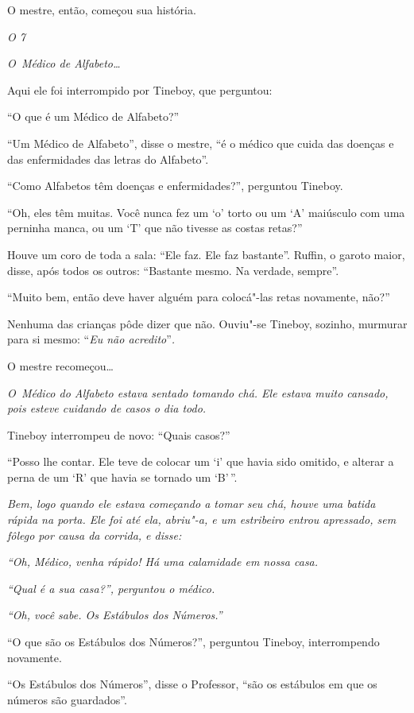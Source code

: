 O mestre, então, começou sua história.

\emph{ O  7  }

\emph{O~Médico de Alfabeto…}

Aqui ele foi interrompido por Tineboy, que perguntou:

``O que é um Médico de Alfabeto?''

``Um Médico de Alfabeto'', disse o mestre, ``é o médico que cuida das
doenças e das enfermidades das letras do Alfabeto''.

``Como Alfabetos têm doenças e enfermidades?'', perguntou Tineboy.

``Oh, eles têm muitas. Você nunca fez um `o' torto ou um `A' maiúsculo
com uma perninha manca, ou um `T' que não tivesse as costas retas?''

Houve um coro de toda a sala: ``Ele faz. Ele faz bastante''. Ruffin, o
garoto maior, disse, após todos os outros: ``Bastante mesmo. Na verdade,
sempre''.

``Muito bem, então deve haver alguém para colocá"-las retas novamente,
não?''

Nenhuma das crianças pôde dizer que não. Ouviu"-se Tineboy, sozinho,
murmurar para si mesmo: ``\emph{Eu não acredito}''\emph{.}

O mestre recomeçou…

\emph{O~Médico do Alfabeto estava sentado tomando chá. Ele estava muito
cansado, pois esteve cuidando de casos o dia todo.}

Tineboy interrompeu de novo: ``Quais casos?''

``Posso lhe contar. Ele teve de colocar um `i' que havia sido omitido, e
alterar a perna de um `R' que havia se tornado um `B'\,''.

\emph{Bem, logo quando ele estava começando a tomar seu chá, houve uma
batida rápida na porta. Ele foi até ela, abriu"-a, e um estribeiro entrou
apressado, sem fôlego por causa da corrida, e disse:}

\emph{``Oh, Médico, venha rápido! Há uma calamidade em nossa casa.}

\emph{``Qual é a sua casa?'', perguntou o médico.}

\emph{``Oh, você sabe. Os Estábulos dos Números.''}

``O que são os Estábulos dos Números?'', perguntou Tineboy,
interrompendo novamente.

``Os Estábulos dos Números'', disse o Professor, ``são os estábulos em
que os números são guardados''.

